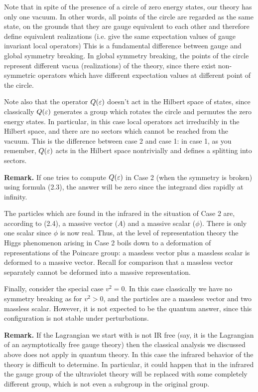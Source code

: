 Note that in spite of the presence of a circle of zero energy states, 
our theory has only one vacuum. In other words, all points of the circle are 
regarded as the same state, on the grounds that they are gauge equivalent 
to each other and therefore define equivalent realizations
(i.e. give the same expectation values of gauge invariant local operators)
This is a fundamental difference between gauge 
and global symmetry breaking. In global symmetry breaking, the points of 
the circle represent different vacua (realizations) of the theory, 
since there exist non-symmetric operators which have different 
expectation values at different point of the circle. 

Note also 
that the operator $Q(\varepsilon)$ doesn't act in the Hilbert space of states, 
since classically $Q(\varepsilon)$ generates a group which rotates the circle 
and permutes the zero energy states. In particular, in this case 
local operators act irreducibly in the Hilbert space, and there are 
no sectors  
which cannot be reached from the vacuum. This is the difference between 
case 2 and case 1: in case 1, as you remember, $Q(\varepsilon)$ acts in the Hilbert 
space nontrivially and defines a splitting into sectors. 

{\bf Remark.} If one tries to compute $Q(\varepsilon)$ in Case 2 (when the symmetry 
is broken) using formula (2.3), the answer will be zero since the integrand 
dies rapidly at infinity. 
 
The particles which are found in the infrared in the situation 
of Case 2 are, according to (2.4),  a massive vector ($A$) and a massive 
scalar ($\phi$). There is only one scalar since $\phi$ is now real.  
Thus, at the level of representation theory the Higgs phenomenon arising 
in Case 2 boils down to a deformation of representations of the Poincare 
group: a massless vector plus a massless scalar is deformed to a massive 
vector. Recall for comparison that a massless vector separately 
cannot be deformed into a massive representation. 

Finally, consider the special case $v^2=0$. In this case classically 
we have no symmetry breaking as for $v^2>0$, and the particles 
are a massless vector and two massless scalar. However, it is not 
expected to be the quantum answer, since this configuration is not stable 
under perturbations. 

{\bf Remark.} If the Lagrangian we start with is not IR free 
(say, it is the Lagrangian of an asymptotically free gauge theory) 
then the classical analysis we discussed above does not apply
in quantum theory. In this case the infrared behavior of the theory 
is difficult to determine. In particular, it could happen that in the 
infrared the gauge group of the ultraviolet theory will be replaced with 
some completely different group, which is not even a subgroup in the original 
group.  

